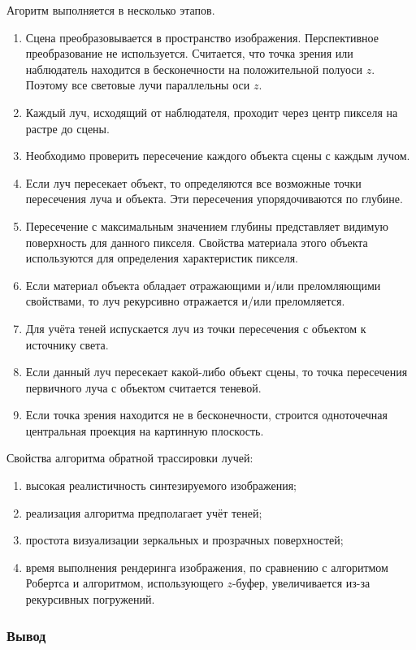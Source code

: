 Агоритм выполняется в несколько этапов.

\begin{enumerate}[label=\arabic*)]
	\item Сцена преобразовывается в пространство изображения. Перспективное преобразование не используется. Считается, что точка зрения или наблюдатель находится в бесконечности на положительной полуоси $z$. Поэтому все световые лучи параллельны оси $z$. 
	\item Каждый луч, исходящий от наблюдателя, проходит через центр пикселя на растре до сцены.
	\item Необходимо проверить пересечение каждого объекта сцены с каждым лучом.
	\item Если луч пересекает объект, то определяются все возможные точки пересечения луча и объекта. Эти пересечения упорядочиваются по глубине.
	\item Пересечение с максимальным значением глубины представляет видимую поверхность для данного пикселя. Свойства материала этого объекта используются для определения характеристик пикселя.
	\item Если материал объекта обладает отражающими и/или преломляющими свойствами, то луч рекурсивно отражается и/или преломляется.
	\item Для учёта теней испускается луч из точки пересечения с объектом к источнику света.
	\item Если данный луч пересекает какой-либо объект сцены, то точка пересечения первичного луча с объектом считается теневой.
	\item Если точка зрения находится не в бесконечности, строится одноточечная центральная проекция на картинную плоскость.
\end{enumerate}


Свойства алгоритма обратной трассировки лучей:
\begin{enumerate}[label=\arabic*)]
	\item высокая реалистичность синтезируемого изображения;
	\item реализация алгоритма предполагает учёт теней;
	\item простота визуализации зеркальных и прозрачных поверхностей;
	\item время выполнения рендеринга изображения, по сравнению с алгоритмом Робертса и алгоритмом, использующего $z$-буфер, увеличивается из-за рекурсивных погружений.
\end{enumerate}

\subsubsection{Вывод}

